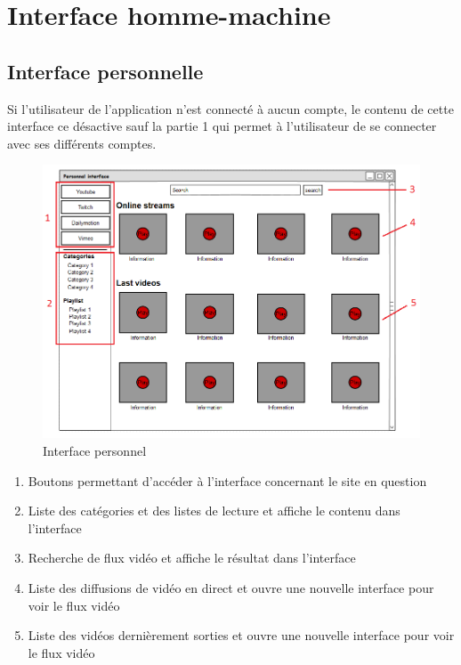 \documentclass[11pt]{report} %
\begin{document}
			\newpage
	
	\section{Interface homme-machine}
		\subsection{Interface personnelle}
		Si l'utilisateur de l'application n'est connecté à aucun compte, le contenu de cette interface ce désactive sauf la partie 1 qui permet à l'utilisateur de se connecter avec ses différents comptes.
		\begin{figure}[h]
			\center
			\includegraphics[width=1\textwidth]{../img/personnalInterfacenum.png}
			\caption{Interface personnel}
			\label{interfacepersonnel}
		\end{figure}
		
			\begin{enumerate}
				\item Boutons permettant d'accéder à l'interface concernant le site en question
				\item Liste des catégories et des listes de lecture et affiche le contenu dans l'interface
				\item Recherche de flux vidéo et affiche le résultat dans l'interface
				\item Liste des diffusions de vidéo en direct et ouvre une nouvelle interface pour voir le flux vidéo
				\item Liste des vidéos dernièrement sorties et ouvre une nouvelle interface pour voir le flux vidéo
			\end{enumerate}
		
\end{document}
